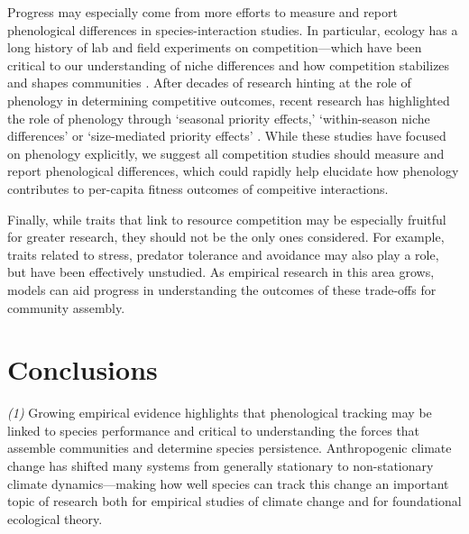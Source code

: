 \documentclass[11pt,letterpaper]{article}
\begin{document}
Progress may especially come from more efforts to measure and report phenological differences in species-interaction studies. In particular, ecology has a long history of lab and field experiments on competition---which have been critical to our understanding of niche differences and how competition stabilizes and shapes communities \citep{Grime:1977sw,Chesson:2004eo}. After decades of research hinting at the role of phenology in determining competitive outcomes, recent research has highlighted the role of phenology through `seasonal priority effects,' `within-season niche differences' or `size-mediated priority effects' \citep{Rasmussen2014,smith2018,taylor2019,blackford2020}. While these studies have focused on phenology explicitly, we suggest all competition studies should measure and report phenological differences, which could rapidly help elucidate how phenology contributes to per-capita fitness outcomes of compeitive interactions.  

Finally, while traits that link to resource competition may be especially fruitful for greater research, they should not be the only ones considered. For example, traits related to stress, predator tolerance and avoidance may also play a role, but have been effectively unstudied.  As empirical research in this area grows, models can aid progress in understanding the outcomes of these trade-offs for community assembly.  


\section{Conclusions}
\emph{(1)} Growing empirical evidence highlights that phenological tracking may be linked to species performance and critical to understanding the forces that assemble communities and determine species persistence. Anthropogenic climate change has shifted many systems from generally stationary to non-stationary climate dynamics---making how well species can track this change an important topic of research both for empirical studies of climate change and for foundational ecological theory. 
\end{document}
